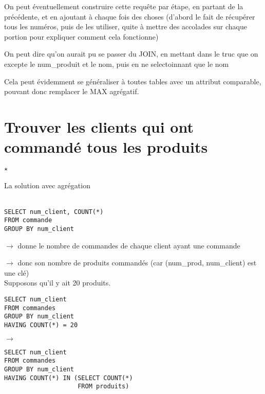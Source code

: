 \begin{com}
	On peut éventuellement construire cette requête par étape, en partant de la précédente, et en ajoutant à chaque fois des choses (d'abord le fait de récupérer tous les numéros, puis de les utiliser, quite à mettre des accolades sur chaque portion pour expliquer comment cela fonctionne)
\end{com}

\begin{com}
	On peut dire qu'on aurait pu se passer du JOIN, en mettant dans le truc que on excepte le num\_produit et le nom, puis en ne selectoinnant que le nom
\end{com}

\begin{rem}
	Cela peut évidemment se généraliser à toutes tables avec un attribut comparable, pouvant donc remplacer le MAX agrégatif.
\end{rem}


\section*{Trouver les clients qui ont commandé tous les produits}

\paragraph{$\star$} La solution avec agrégation
\\
\\
\begin{minipage}{0.4\linewidth}

	\begin{lstlisting}
SELECT num_client, COUNT(*)
FROM commande
GROUP BY num_client
	\end{lstlisting}
	
	$\to$ donne le nombre de commandes de chaque client ayant une commande

	$\to$ donc son nombre de produits commandés (car (num\_prod, num\_client) est une clé)\\
	
	Supposons qu'il y ait 20 produits.
	\begin{lstlisting}
SELECT num_client
FROM commandes
GROUP BY num_client
HAVING COUNT(*) = 20
	\end{lstlisting}
	
\end{minipage} \qquad $\longrightarrow$ \qquad
\begin{minipage}{0.47\linewidth}
	
	\begin{lstlisting}
SELECT num_client
FROM commandes
GROUP BY num_client
HAVING COUNT(*) IN (SELECT COUNT(*)
                    FROM produits)
	\end{lstlisting}
	
\end{minipage}

